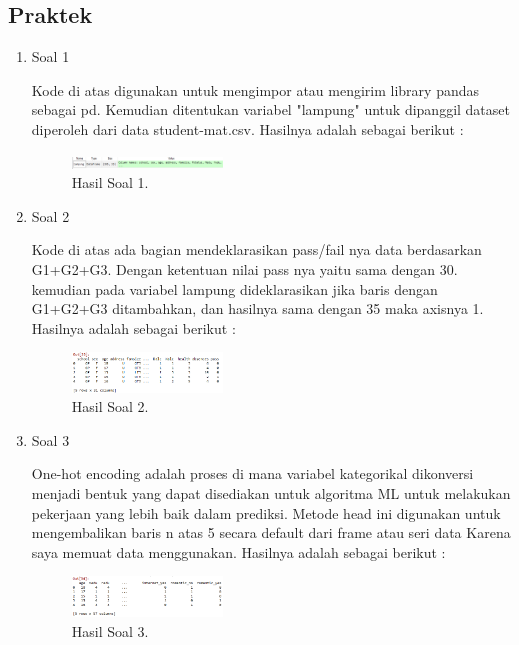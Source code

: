 \subsection{Praktek}
\begin{enumerate}
	\item Soal 1
	\hfill\break
	
	Kode di atas digunakan untuk mengimpor atau mengirim library pandas sebagai pd. Kemudian ditentukan variabel "lampung" untuk dipanggil dataset diperoleh dari data student-mat.csv. Hasilnya adalah sebagai berikut :
	\begin{figure}[H]
	\centering
		\includegraphics[width=4cm]{figures/1174008/2/hasilsoal1.PNG}
		\caption{Hasil Soal 1.}
	\end{figure}

	\item Soal 2
	\hfill\break
	
	Kode di atas ada bagian mendeklarasikan pass/fail nya data berdasarkan G1+G2+G3. Dengan ketentuan nilai pass nya yaitu sama dengan 30. kemudian pada variabel lampung dideklarasikan jika baris dengan G1+G2+G3 ditambahkan, dan hasilnya sama dengan 35 maka axisnya 1. Hasilnya adalah sebagai berikut :
	\begin{figure}[H]
	\centering
		\includegraphics[width=4cm]{figures/1174008/2/hasilsoal2.PNG}
		\caption{Hasil Soal 2.}
	\end{figure}
	
	\item Soal 3
	\hfill\break
	
	One-hot encoding adalah proses di mana variabel kategorikal dikonversi menjadi bentuk yang dapat disediakan untuk algoritma ML untuk melakukan pekerjaan yang lebih baik dalam prediksi. Metode head ini digunakan untuk mengembalikan baris n atas 5 secara default dari frame atau seri data Karena saya memuat data menggunakan. Hasilnya adalah sebagai berikut :
	\begin{figure}[H]
	\centering
		\includegraphics[width=4cm]{figures/1174008/2/hasilsoal3.PNG}
		\caption{Hasil Soal 3.}
	\end{figure}


\end{enumerate}
